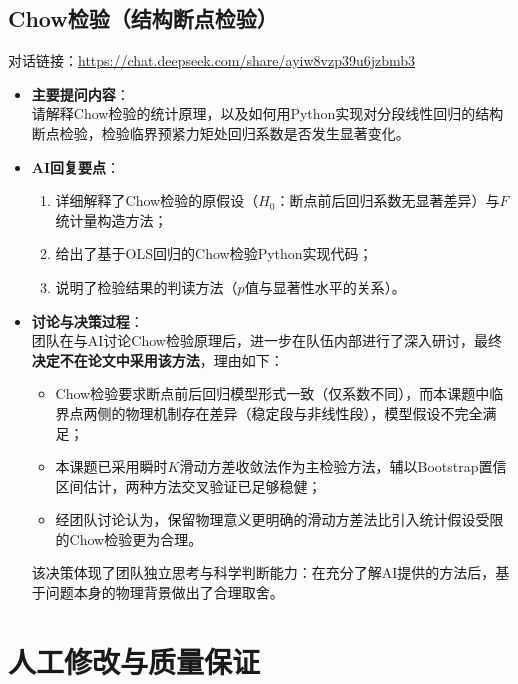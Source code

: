 \documentclass[12pt,a4paper]{article}
\begin{document}
\subsection{Chow检验（结构断点检验）}

对话链接：\url{https://chat.deepseek.com/share/ayiw8vzp39u6jzbmb3}

\begin{itemize}
    \item \textbf{主要提问内容}：\\
    请解释Chow检验的统计原理，以及如何用Python实现对分段线性回归的结构断点检验，检验临界预紧力矩处回归系数是否发生显著变化。
    
    \item \textbf{AI回复要点}：
    \begin{enumerate}
        \item 详细解释了Chow检验的原假设（$H_0$：断点前后回归系数无显著差异）与$F$统计量构造方法；
        \item 给出了基于OLS回归的Chow检验Python实现代码；
        \item 说明了检验结果的判读方法（$p$值与显著性水平的关系）。
    \end{enumerate}
    
    \item \textbf{讨论与决策过程}：\\
    团队在与AI讨论Chow检验原理后，进一步在队伍内部进行了深入研讨，最终\textbf{决定不在论文中采用该方法}，理由如下：
    \begin{itemize}
        \item Chow检验要求断点前后回归模型形式一致（仅系数不同），而本课题中临界点两侧的物理机制存在差异（稳定段与非线性段），模型假设不完全满足；
        \item 本课题已采用瞬时$K$滑动方差收敛法作为主检验方法，辅以Bootstrap置信区间估计，两种方法交叉验证已足够稳健；
        \item 经团队讨论认为，保留物理意义更明确的滑动方差法比引入统计假设受限的Chow检验更为合理。
    \end{itemize}
    该决策体现了团队独立思考与科学判断能力：在充分了解AI提供的方法后，基于问题本身的物理背景做出了合理取舍。
\end{itemize}

\section{人工修改与质量保证}
\end{document}
